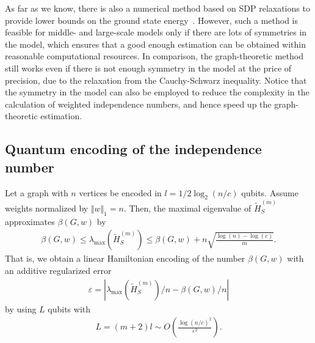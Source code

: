 As far as we know, there is also a numerical method based on SDP relaxations to provide lower bounds on the ground state energy~\cite{wang2024certifying}. However, such a method is feasible for middle- and large-scale models only if there are lots of symmetries in the model, which ensures that a good enough estimation can be obtained within reasonable computational resources. In comparison, the graph-theoretic method still works even if there is not enough symmetry in the model at the price of precision, due to the relaxation from the Cauchy-Schwarz inequality. Notice that the symmetry in the model can also be employed to reduce the complexity in the calculation of weighted independence numbers, and hence speed up the graph-theoretic estimation.


\subsection{Quantum encoding of the independence number}\label{ssec:alpha}
\begin{theorem}
    Let a graph with $n$ vertices be encoded in $l=1/2 \log_2(n/c)$ qubits. Assume weights normalized by $\Vert w \Vert_1=n$. Then, the maximal eigenvalue of $\tilde{H}_S^{(m)}$ approximates $\beta(G,w)$ by 
    \begin{align}\label{eq:definetti-without-proj}
        \beta(G,w) \leq \lambda_{\max}\left( \tilde{H}_S^{(m)} \right) \leq \beta(G,w) + n\sqrt{ \frac{\log(n)-\log(c)}{m}}.
    \end{align}
 That is, we obtain a linear Hamiltonian encoding of the number $\beta(G,w)$ with an additive regularized error 
    \begin{align}
        \varepsilon =\left|\lambda_{\max}(\tilde{H}_S^{(m)})/n -\beta(G,w)/n\right|
    \end{align}
    by using $L$ qubits with
    \begin{align}
        L=(m+2)l\sim  O\left(\frac{\log(n/c)^2 }{\varepsilon^2}\right).
    \end{align}
\end{theorem}
